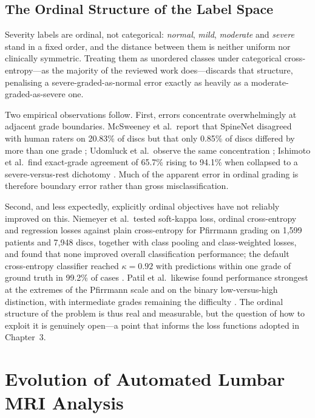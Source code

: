 \subsection{The Ordinal Structure of the Label Space}
\label{sec:lr-ordinality}

Severity labels are ordinal, not categorical: \emph{normal}, \emph{mild},
\emph{moderate} and \emph{severe} stand in a fixed order, and the distance
between them is neither uniform nor clinically symmetric. Treating them as
unordered classes under categorical cross-entropy---as the majority of the
reviewed work does---discards that structure, penalising a
severe-graded-as-normal error exactly as heavily as a moderate-graded-as-severe
one.

Two empirical observations follow. First, errors concentrate overwhelmingly at
adjacent grade boundaries. McSweeney et al.\ report that SpineNet disagreed with
human raters on 20.83\% of discs but that only 0.85\% of discs differed by more
than one grade \cite{mcsweeney2023external}; Udomluck et al.\ observe the same
concentration \cite{udomluck2026multitask}; Ishimoto et al.\ find exact-grade
agreement of 65.7\% rising to 94.1\% when collapsed to a severe-versus-rest
dichotomy \cite{ishimoto2020could}. Much of the apparent error in ordinal
grading is therefore boundary error rather than gross misclassification.

Second, and less expectedly, explicitly ordinal objectives have not reliably
improved on this. Niemeyer et al.\ tested soft-kappa loss, ordinal
cross-entropy and regression losses against plain cross-entropy for Pfirrmann
grading on 1{,}599 patients and 7{,}948 discs, together with class pooling and
class-weighted losses, and found that none improved overall classification
performance; the default cross-entropy classifier reached $\kappa = 0.92$ with
predictions within one grade of ground truth in 99.2\% of cases
\cite{niemeyer2021a}. Patil et al.\ likewise found performance strongest at the
extremes of the Pfirrmann scale and on the binary low-versus-high distinction,
with intermediate grades remaining the difficulty \cite{patil2026mribased}. The
ordinal structure of the problem is thus real and measurable, but the question
of how to exploit it is genuinely open---a point that informs the loss functions
adopted in Chapter~3.

\section{Evolution of Automated Lumbar MRI Analysis}
\label{sec:lr-evolution}

